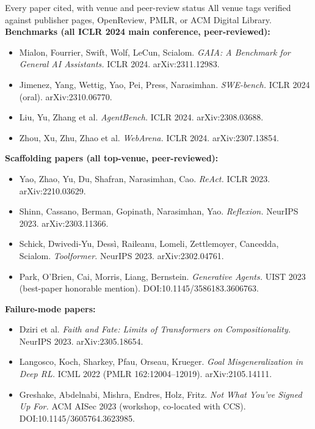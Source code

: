\documentclass[aspectratio=169, 12pt, xcolor={dvipsnames,table}]{beamer}
\begin{document}
\begin{frame}[allowframebreaks]{Every paper cited, with venue and peer-review status}
  \footnotesize
  All venue tags verified against publisher pages, OpenReview, PMLR, or ACM Digital Library.\\[0.8em]
  \textbf{Benchmarks (all ICLR 2024 main conference, peer-reviewed):}
  \begin{itemize}\setlength\itemsep{0.35em}
    \item Mialon, Fourrier, Swift, Wolf, LeCun, Scialom. \emph{GAIA: A Benchmark for General AI Assistants.} ICLR 2024. arXiv:2311.12983.
    \item Jimenez, Yang, Wettig, Yao, Pei, Press, Narasimhan. \emph{SWE-bench.} ICLR 2024 (oral). arXiv:2310.06770.
    \item Liu, Yu, Zhang et al. \emph{AgentBench.} ICLR 2024. arXiv:2308.03688.
    \item Zhou, Xu, Zhu, Zhao et al. \emph{WebArena.} ICLR 2024. arXiv:2307.13854.
  \end{itemize}
  \textbf{Scaffolding papers (all top-venue, peer-reviewed):}
  \begin{itemize}\setlength\itemsep{0.35em}
    \item Yao, Zhao, Yu, Du, Shafran, Narasimhan, Cao. \emph{ReAct.} ICLR 2023. arXiv:2210.03629.
    \item Shinn, Cassano, Berman, Gopinath, Narasimhan, Yao. \emph{Reflexion.} NeurIPS 2023. arXiv:2303.11366.
    \item Schick, Dwivedi-Yu, Dess{\`i}, Raileanu, Lomeli, Zettlemoyer, Cancedda, Scialom. \emph{Toolformer.} NeurIPS 2023. arXiv:2302.04761.
    \item Park, O'Brien, Cai, Morris, Liang, Bernstein. \emph{Generative Agents.} UIST 2023 (best-paper honorable mention). DOI:10.1145/3586183.3606763.
  \end{itemize}
  \textbf{Failure-mode papers:}
  \begin{itemize}\setlength\itemsep{0.35em}
    \item Dziri et al. \emph{Faith and Fate: Limits of Transformers on Compositionality.} NeurIPS 2023. arXiv:2305.18654.
    \item Langosco, Koch, Sharkey, Pfau, Orseau, Krueger. \emph{Goal Misgeneralization in Deep RL.} ICML 2022 (PMLR 162:12004--12019). arXiv:2105.14111.
    \item Greshake, Abdelnabi, Mishra, Endres, Holz, Fritz. \emph{Not What You've Signed Up For.} ACM AISec 2023 (workshop, co-located with CCS). DOI:10.1145/3605764.3623985.

\end{itemize}
\end{frame}
\end{document}
